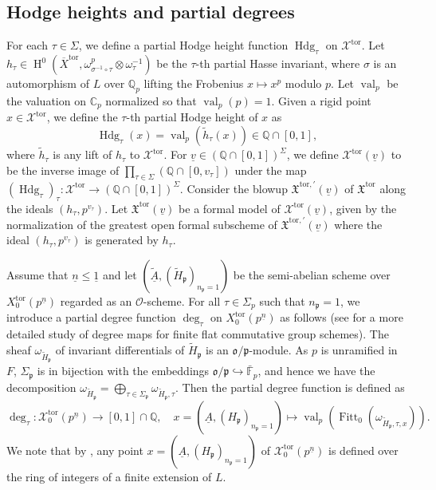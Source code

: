 \documentclass[11pt]{amsart}
\theoremstyle{definition} %
\theoremstyle{plain} %
\theoremstyle{remark} %
\newcommand{\CC}{\mathbb C}
\newcommand{\FF}{{\mathbb F}}
\newcommand{\QQ}{{\mathbb Q}}
\newcommand{\cO}{{\mathcal O}}
\newcommand{\cX}{{\mathcal X}}
\newcommand{\frakX}{\mathfrak X}
\newcommand{\frako}{\mathfrak o}
\newcommand{\frakp}{\mathfrak p}
\newcommand{\tor}{\mathrm{tor}} %
\DeclareMathOperator\val{val} %
\DeclareMathOperator{\Hdg}{Hdg}
\DeclareMathOperator{\Fitt}{Fitt}
\DeclareMathOperator\rH{H}
\begin{document}
\subsection{Hodge heights and partial degrees} \label{sec:Hodge}
For each $\tau\in\Sigma$, we define a partial Hodge height function $\Hdg_\tau$ on $\cX^\tor$.
Let $h_\tau\in \rH^0(\overline{X}^\tor,\omega^p_{\sigma^{-1}\circ \tau}\otimes \omega^{-1}_\tau)$ be the $\tau$-th partial Hasse invariant, where $\sigma$ is an automorphism of $L$ over $\QQ_p$ lifting the Frobenius $x\mapsto x^p$ modulo $p$. Let $\val_p$ be the valuation on $\CC_p$ normalized so that $\val_p(p)=1$.
Given a rigid point $x\in\cX^\tor$, we define the $\tau$-th partial Hodge height of $x$ as
\[
\Hdg_\tau(x) = \val_p(\tilde{h}_\tau(x))\in\QQ\cap [0,1],
\] 
where $\tilde{h}_\tau$ is any lift of $h_\tau$ to $\cX^\tor$.
For $\underline{v}\in (\QQ\cap[0,1])^\Sigma$, we define $\cX^\tor(\underline{v})$ to be the inverse image of $\prod_{\tau\in\Sigma}(\QQ\cap[0,v_\tau])$ under the map $(\Hdg_\tau)_\tau\colon \cX^\tor\rightarrow (\QQ\cap [0,1])^\Sigma$.
Consider the blowup $\frakX^{\tor,\prime}(\underline{v})$ of $\frakX^\tor$ along the ideals $(h_\tau,p^{v_\tau})$. 
Let $\frakX^\tor(\underline{v})$ be a formal model of $\cX^\tor(\underline{v})$, given by the normalization of the greatest open formal subscheme of $\frakX^{\tor,\prime}(\underline{v})$ where the ideal $(h_\tau,p^{v_\tau})$ is generated by $h_\tau$.



Assume that $\underline{n}\leqslant\underline{1}$ and let $(\underline{\widetilde{A}}, (\widetilde{H}_\frakp)_{n_\frakp=1})$ be the semi-abelian scheme over $X_0^\tor(p^{\underline{n}})$ regarded as an $\cO$-scheme. 
  For all $\tau\in \Sigma_p$ such that $n_\frakp = 1$, 
we introduce  a  partial degree function $\deg_\tau$ on $X_0^\tor(p^{\underline{n}})$ as follows (see \cite{Fargues} for a more detailed study of  degree maps for   finite flat commutative group schemes).
The sheaf $\omega_{\widetilde{H}_\frakp}$ of invariant differentials of $\widetilde{H}_\frakp$ is  an  $\frako/\frakp$-module.
As $p$ is unramified in $F$, $\Sigma_\frakp$ is in bijection with the embeddings $\frako/\frakp \hookrightarrow \bar\FF_p$, and hence we have the decomposition $\omega_{\widetilde{H}_\frakp} = \bigoplus_{\tau\in \Sigma_\frakp} \omega_{\widetilde{H}_\frakp,\tau}$.
Then the partial degree function is defined as 
\[\deg_\tau\colon \cX_0^\tor(p^{\underline{n}}) \rightarrow [0,1]\cap \QQ, \quad x = (\underline{A},(H_\frakp)_{n_\frakp=1}) \mapsto \val_p \left(\Fitt_0(\omega_{\widetilde{H}_\frakp,\tau,x})\right).
\]
We note that by \cite[Section 8.3, Lemma 6]{BLR}, any  point  $x = (\underline{A},(H_\frakp)_{n_\frakp=1})$  of $\cX_0^\tor(p^{\underline{n}})$ is defined over the ring of integers of a finite extension of $L$. 
\end{document}
